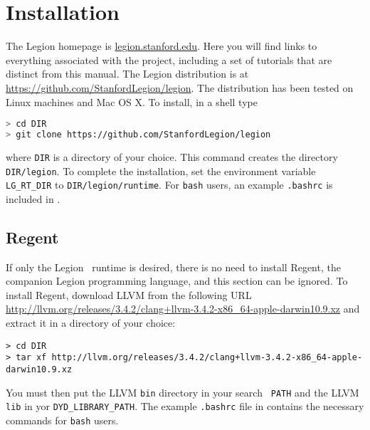 
\chapter{Installation}
\label{chap:start}

The Legion homepage is \url{legion.stanford.edu}.  Here you will find
links to everything associated with the project, including a set of
tutorials that are distinct from this manual.  The Legion distribution is at
\url{https://github.com/StanfordLegion/legion}.  The distribution has been
tested on Linux machines and Mac OS X.  To install, in a shell type
\begin{lstlisting}[language=bash]
> cd DIR
> git clone https://github.com/StanfordLegion/legion
\end{lstlisting}
where {\tt DIR} is a directory of your choice.  This command creates 
the directory {\tt DIR/legion}.  To complete the installation,
set the environment variable {\tt LG\_RT\_DIR} to {\tt DIR/legion/runtime}.
For {\tt bash} users, an example {\tt .bashrc} is included in
.

\section{Regent}

If only the Legion \Cpp\ runtime is desired, there is no need to install Regent, the companion
Legion programming language, and this section can be ignored.  To install Regent, download LLVM
from the following URL
{\small\url{http://llvm.org/releases/3.4.2/clang+llvm-3.4.2-x86_64-apple-darwin10.9.xz}}
and extract it in a directory of your choice:
{\small
\begin{verbatim}
> cd DIR
> tar xf http://llvm.org/releases/3.4.2/clang+llvm-3.4.2-x86_64-apple-darwin10.9.xz
\end{verbatim}
}
You must then put the LLVM {\tt bin} directory in your search {\tt
  PATH} and the LLVM {\tt lib} in yor {\tt DYD\_LIBRARY\_PATH}.  The
example {\tt .bashrc} file in  contains the
necessary commands for {\tt bash} users.


